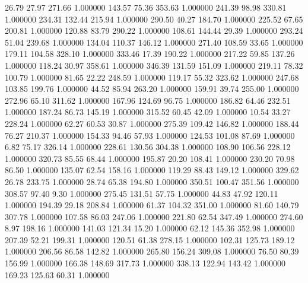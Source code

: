      26.79     27.97    271.66  1.000000
    143.57     75.36    353.63  1.000000
    241.39     98.98    330.81  1.000000
    234.31    132.44    215.94  1.000000
    290.50     40.27    184.70  1.000000
    225.52     67.65    200.81  1.000000
    120.88     83.79    290.22  1.000000
    108.61    144.44     29.39  1.000000
    293.24     51.04    239.68  1.000000
    134.04    110.37    146.12  1.000000
    271.40    108.59     33.65  1.000000
    179.11    104.58    328.10  1.000000
    333.46     17.39    190.22  1.000000
    217.22     59.85    137.26  1.000000
    118.24     30.97    358.61  1.000000
    346.39    131.59    151.09  1.000000
    219.11     78.32    100.79  1.000000
     81.65     22.22    248.59  1.000000
    119.17     55.32    323.62  1.000000
    247.68    103.85    199.76  1.000000
     44.52     85.94    263.20  1.000000
    159.91     39.74    255.00  1.000000
    272.96     65.10    311.62  1.000000
    167.96    124.69     96.75  1.000000
    186.82     64.46    232.51  1.000000
    187.24     86.73    145.19  1.000000
    315.52     60.45     42.09  1.000000
     10.54     33.27    228.24  1.000000
     62.27     60.53     30.87  1.000000
    275.39    109.42    146.82  1.000000
    188.44     76.27    210.37  1.000000
    154.33     94.46     57.93  1.000000
    124.53    101.08     87.69  1.000000
      6.82     75.17    326.14  1.000000
    228.61    130.56    304.38  1.000000
    108.90    106.56    228.12  1.000000
    320.73     85.55     68.44  1.000000
    195.87     20.20    108.41  1.000000
    230.20     70.98     86.50  1.000000
    135.07     62.54    158.16  1.000000
    119.29     88.43    149.12  1.000000
    329.62     26.78    233.75  1.000000
     28.74     65.38    194.80  1.000000
    350.51    100.47    351.56  1.000000
    308.57     97.40      9.30  1.000000
    275.45    131.51     57.75  1.000000
     44.83     47.92    120.11  1.000000
    194.39     29.18    208.84  1.000000
     61.37    104.32    351.00  1.000000
     81.60    140.79    307.78  1.000000
    107.58     86.03    247.06  1.000000
    221.80     62.54    347.49  1.000000
    274.60      8.97    198.16  1.000000
    141.03    121.34     15.20  1.000000
     62.12    145.36    352.98  1.000000
    207.39     52.21    199.31  1.000000
    120.51     61.38    278.15  1.000000
    102.31    125.73    189.12  1.000000
    206.56     86.58    142.82  1.000000
    265.80    156.24    309.08  1.000000
     76.50     80.39    156.99  1.000000
    166.38    148.69    317.73  1.000000
    338.13    122.94    143.42  1.000000
    169.23    125.63     60.31  1.000000
